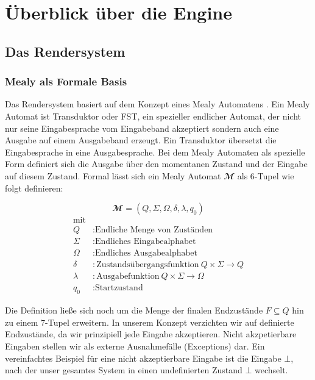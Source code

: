 \chapter{Überblick über die Engine}

\section{Das Rendersystem}


\subsection{Mealy als Formale Basis}

Das Rendersystem basiert auf dem Konzept eines Mealy Automatens \cite{Mealy1955}. Ein Mealy Automat ist Transduktor oder \ac{FST}, ein spezieller endlicher Automat, der nicht nur seine Eingabesprache vom Eingabeband akzeptiert sondern auch eine Ausgabe auf einem Ausgabeband erzeugt. Ein Transduktor übersetzt die Eingabesprache in eine Ausgabesprache. Bei dem Mealy Automaten als spezielle Form definiert sich die Ausgabe über den momentanen Zustand und der Eingabe auf diesem Zustand. Formal lässt sich ein Mealy Automat $\mathbfcal{M}$ als 6-Tupel wie folgt definieren:

\[
\mathbfcal{M} = \left( Q, \Sigma, \Omega, \delta, \lambda, q_0 \right)
\]
\begin{align*}
	\text{mit}\\
	Q &: \text{Endliche Menge von Zuständen} \\
	\Sigma  &:\text{Endliches Eingabealphabet} \\
	\Omega  &:\text{Endliches Ausgabealphabet} \\
	\delta  &:\text{Zustandsübergangsfunktion}\ Q \times \Sigma \rightarrow Q \\
	\lambda &:\text{Ausgabefunktion}\ Q \times \Sigma \rightarrow \Omega \\
	q_0 &: \text{Startzustand}
\end{align*}

Die Definition ließe sich noch um die Menge der finalen Endzustände $F \subseteq Q$ hin zu einem 7-Tupel erweitern. In unserem Konzept verzichten wir auf definierte Endzustände, da wir prinzipiell jede Eingabe akzeptieren. Nicht akzpetierbare Eingaben stellen wir als externe Ausnahmefälle (Exceptions) dar. Ein vereinfachtes Beispiel für eine nicht akzeptierbare Eingabe ist die Eingabe $\bot$, nach der unser gesamtes System in einen undefinierten Zustand $\bot$ wechselt.

